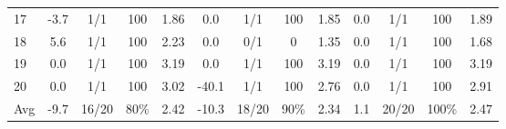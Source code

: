 \begin{table}[p]
{\begin{tabular}{l|cccc|cccc|cccc}
17 & -3.7 & 1/1 & 100 & 1.86 & 0.0 & 1/1 & 100 & 1.85 & 0.0 & 1/1 & 100 & 1.89 \\
18 & 5.6 & 1/1 & 100 & 2.23 & 0.0 & 0/1 & 0 & 1.35 & 0.0 & 1/1 & 100 & 1.68 \\
19 & 0.0 & 1/1 & 100 & 3.19 & 0.0 & 1/1 & 100 & 3.19 & 0.0 & 1/1 & 100 & 3.19 \\
20 & 0.0 & 1/1 & 100 & 3.02 & -40.1 & 1/1 & 100 & 2.76 & 0.0 & 1/1 & 100 & 2.91 \\
\midrule
Avg & -9.7 & 16/20 & 80\% & 2.42 & -10.3 & 18/20 & 90\% & 2.34 & 1.1 & 20/20 & 100\% & 2.47 \\
\bottomrule
\end{tabular}%
}
\end{table}
